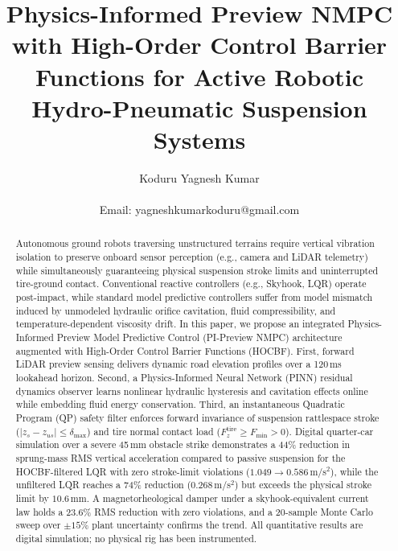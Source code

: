 \documentclass[journal,twocolumn,letterpaper]{IEEEtran}
\begin{document}
\title{Physics-Informed Preview NMPC with High-Order Control Barrier Functions for Active Robotic Hydro-Pneumatic Suspension Systems}

\author{Koduru Yagnesh Kumar\\
\\
Email: yagneshkumarkoduru@gmail.com}

\maketitle

\begin{abstract}
Autonomous ground robots traversing unstructured terrains require vertical vibration isolation to preserve onboard sensor perception (e.g., camera and LiDAR telemetry) while simultaneously guaranteeing physical suspension stroke limits and uninterrupted tire-ground contact. Conventional reactive controllers (e.g., Skyhook, LQR) operate post-impact, while standard model predictive controllers suffer from model mismatch induced by unmodeled hydraulic orifice cavitation, fluid compressibility, and temperature-dependent viscosity drift. In this paper, we propose an integrated Physics-Informed Preview Model Predictive Control (PI-Preview NMPC) architecture augmented with High-Order Control Barrier Functions (HOCBF). First, forward LiDAR preview sensing delivers dynamic road elevation profiles over a 120\,ms lookahead horizon. Second, a Physics-Informed Neural Network (PINN) residual dynamics observer learns nonlinear hydraulic hysteresis and cavitation effects online while embedding fluid energy conservation. Third, an instantaneous Quadratic Program (QP) safety filter enforces forward invariance of suspension rattlespace stroke ($|z_s - z_{us}| \le \delta_{\max}$) and tire normal contact load ($F_{z}^{\text{tire}} \ge F_{\min} > 0$). Digital quarter-car simulation over a severe 45\,mm obstacle strike demonstrates a 44\% reduction in sprung-mass RMS vertical acceleration compared to passive suspension for the HOCBF-filtered LQR with zero stroke-limit violations ($1.049 \to 0.586$\,m/s$^2$), while the unfiltered LQR reaches a 74\% reduction ($0.268$\,m/s$^2$) but exceeds the physical stroke limit by $10.6$\,mm. A magnetorheological damper under a skyhook-equivalent current law holds a 23.6\% RMS reduction with zero violations, and a 20-sample Monte Carlo sweep over $\pm15\%$ plant uncertainty confirms the trend. All quantitative results are digital simulation; no physical rig has been instrumented.
\end{abstract}
\end{document}
